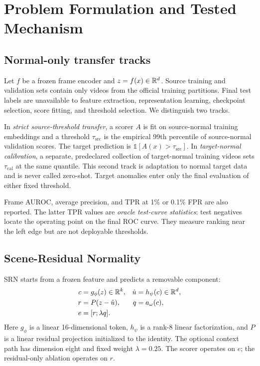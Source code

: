 \section{Problem Formulation and Tested Mechanism}
\label{sec:method}

\subsection{Normal-only transfer tracks}

Let $f$ be a frozen frame encoder and $z=f(x)\in\mathbb{R}^d$. Source training and validation sets contain only videos from the official training partitions. Final test labels are unavailable to feature extraction, representation learning, checkpoint selection, score fitting, and threshold selection. We distinguish two tracks.

In \emph{strict source-threshold transfer}, a scorer $A$ is fit on source-normal training embeddings and a threshold $\tau_{\mathrm{src}}$ is the empirical 99th percentile of source-normal validation scores. The target prediction is $\mathbb{1}[A(x)>\tau_{\mathrm{src}}]$. In \emph{target-normal calibration}, a separate, predeclared collection of target-normal training videos sets $\tau_{\mathrm{cal}}$ at the same quantile. This second track is adaptation to normal target data and is never called zero-shot. Target anomalies enter only the final evaluation of either fixed threshold.

Frame AUROC, average precision, and TPR at 1\% or 0.1\% FPR are also reported. The latter TPR values are \emph{oracle test-curve statistics}: test negatives locate the operating point on the final ROC curve. They measure ranking near the left edge but are not deployable thresholds.

\subsection{Scene-Residual Normality}

SRN starts from a frozen feature and predicts a removable component:
\begin{align}
    c &= g_{\phi}(z)\in\mathbb{R}^k, &
    \hat u &= h_{\psi}(c)\in\mathbb{R}^d, \\
    r &= P(z-\hat u), &
    q &= a_{\omega}(c), \\
    e &= [r;\lambda q].
\end{align}
Here $g_{\phi}$ is a linear 16-dimensional token, $h_{\psi}$ is a rank-8 linear factorization, and $P$ is a linear residual projection initialized to the identity. The optional context path has dimension eight and fixed weight $\lambda=0.25$. The scorer operates on $e$; the residual-only ablation operates on $r$.

